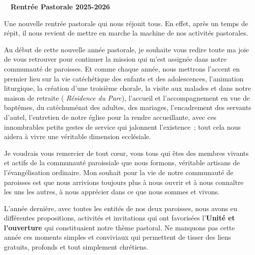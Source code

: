  \begin{center}
 \textbf{
\og 
Rentrée Pastorale 2025-2026
 \fg{}
 }
 \end{center}

Une nouvelle rentrée pastorale qui nous réjouit tous. En effet, après un temps de répit, il nous revient de mettre en marche la machine de nos activités pastorales.

Au début de cette nouvelle année pastorale, je souhaite vous redire toute ma joie de vous retrouver pour continuer la mission qui m’est assignée dans notre communauté de paroisses. Et comme chaque année, nous mettrons l’accent en premier lieu sur la vie catéchétique des enfants et des adolescences, l’animation liturgique, la création d’une troisième chorale, la visite aux malades et dans notre maison de retraite ( \emph{Résidence du Parc}), l’accueil et l’accompagnement en vue de baptêmes,  du catéchuménat des adultes, des mariages, l’encadrement  des servants d’autel, l’entretien de notre église pour la rendre  accueillante, avec ces innombrables petits gestes de service qui jalonnent l’existence ; tout cela nous aidera à vivre une véritable dimension ecclésiale.

Je voudrais vous remercier de tout cœur, vous tous qui êtes des membres vivants et actifs de la communauté paroissiale que nous formons, véritable artisans de l’évangélisation ordinaire. Mon souhait pour la vie de notre communauté de paroisses est que nous arrivions toujours plus à nous ouvrir et à nous connaître les uns les autres, à nous apprécier dans ce que nous sommes et vivons.

L’année dernière, avec toutes les entités de nos deux paroisses, nous avons eu différentes propositions, activités et invitations qui ont favorisées l’\textbf{Unité et l’ouverture} qui constituaient notre thème pastoral. Ne manquons pas cette année ces moments simples et conviviaux qui permettent de tisser des liens gratuits, profonds et tout simplement chrétiens.

